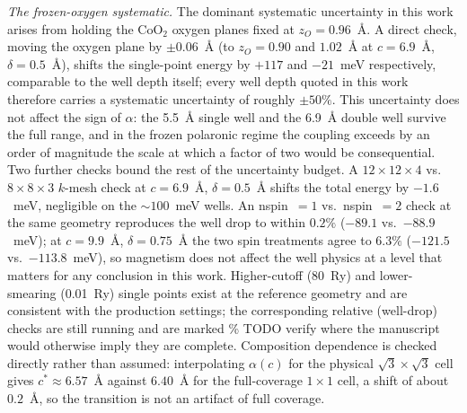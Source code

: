 \documentclass[aps,10pt,preprint,superscriptaddress,floatfix]{revtex4-2}
\begin{document}
\emph{The frozen-oxygen systematic.} The dominant systematic uncertainty in this work arises from
holding the CoO$_2$ oxygen planes fixed at $z_O=0.96$~\AA. A direct check, moving the oxygen plane by
$\pm0.06$~\AA{} (to $z_O=0.90$ and $1.02$~\AA{} at $c=6.9$~\AA, $\delta=0.5$~\AA), shifts the
single-point energy by $+117$ and $-21$~meV respectively, comparable to the well depth itself; every
well depth quoted in this work therefore carries a systematic uncertainty of roughly $\pm50\%$. This
uncertainty does not affect the sign of $\alpha$: the 5.5~\AA{} single well and the 6.9~\AA{} double
well survive the full range, and in the frozen polaronic regime the coupling exceeds by an order of
magnitude the scale at which a factor of two would be consequential. Two further checks bound the rest of the uncertainty
budget. A $12\times12\times4$ vs.\ $8\times8\times3$ $k$-mesh check at $c=6.9$~\AA, $\delta=0.5$~\AA{}
shifts the total energy by $-1.6$~meV, negligible on the $\sim100$~meV wells. An nspin~$=1$ vs.\
nspin~$=2$ check at the same geometry reproduces the well drop to within $0.2\%$ ($-89.1$ vs.\
$-88.9$~meV); at $c=9.9$~\AA, $\delta=0.75$~\AA{} the two spin treatments agree to $6.3\%$
($-121.5$ vs.\ $-113.8$~meV), so magnetism does not affect the well physics at a level that matters
for any conclusion in this work. Higher-cutoff (80~Ry) and lower-smearing (0.01~Ry) single points
exist at the reference geometry and are consistent with the production settings; the corresponding
relative (well-drop) checks are still running and are marked \% TODO verify where the manuscript
would otherwise imply they are complete. Composition dependence is checked directly rather than
assumed: interpolating $\alpha(c)$ for the physical $\sqrt3\times\sqrt3$ cell gives
$c^\ast\approx6.57$~\AA{} against $6.40$~\AA{} for the full-coverage $1\times1$ cell, a shift of
about $0.2$~\AA, so the transition is not an artifact of full coverage.
\end{document}
